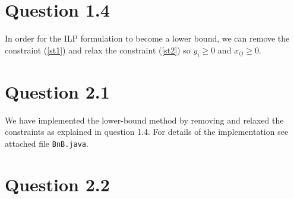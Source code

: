 \documentclass[10pt]{article}
\begin{document}

\section*{Question 1.4} %
\label{sec:question_1_4}
In order for the ILP formulation to become a lower bound, we can remove the constraint (\ref{st1}) and relax the constraint (\ref{st2}) so $y_i \geq 0$ and $x_{ij} \geq 0$.

\section*{Question 2.1} %
\label{sec:question_2_1}
We have implemented the lower-bound method by removing and relaxed the constraints as explained in question 1.4. For details of the implementation see attached file \texttt{BnB.java}. 

\section*{Question 2.2} %
\label{sec:question_2_2}
  



%
%
\end{document}

